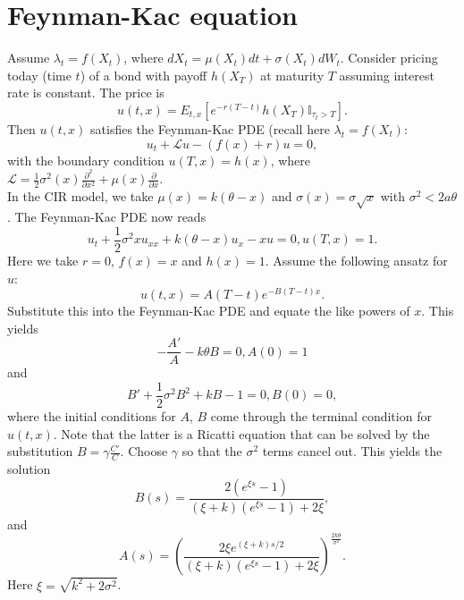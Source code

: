 \documentclass[a4paper,twoside,10pt]{report}
\begin{document}
\chapter{Feynman-Kac equation}
Assume $\lambda_t = f(X_t)$, where $dX_t = \mu(X_t)dt + \sigma(X_t)dW_t$. Consider pricing today (time $t$) of a bond with payoff $h(X_T)$ at maturity $T$ assuming interest rate is constant. The price is \[ u(t,x) = E_{t,x}[e^{-r(T-t)}h(X_T)\mathbb{I}_{\tau_t > T}].\] Then $u(t,x)$ satisfies the Feynman-Kac PDE (recall here $\lambda_t = f(X_t)$: \[ u_t + \mathcal{L}u - (f(x)+r)u = 0, \] with the boundary condition $u(T,x)=h(x)$, where $\mathcal{L} = \frac{1}{2}\sigma^2(x)\frac{\partial^2}{\partial x^2} + \mu(x)\frac{\partial}{\partial x}$. \\
In the CIR model, we take $\mu(x) = k(\theta - x)$ and $\sigma(x) = \sigma \sqrt{x}$ with $\sigma^2 < 2a\theta$. The Feynman-Kac PDE now reads \[ u_t + \frac{1}{2} \sigma^2 x u_{xx} + k(\theta - x)u_x - xu = 0, u(T,x) = 1.\] Here we take $r=0$, $f(x)=x$ and $h(x)=1$. Assume the following ansatz for $u$: 
\begin{equation} \label{fk:sol}
u(t,x) = A(T-t)e^{-B(T-t)x}.
\end{equation} 
Substitute this into the Feynman-Kac PDE and equate the like powers of $x$. This yields \[ - \frac{A'}{A} - k \theta B=0, A(0) = 1\] and \[ B' + \frac{1}{2} \sigma^2 B^2 + kB -1 =0, B(0)=0,\]
where the initial conditions for $A$, $B$ come through the terminal condition for $u(t,x)$. Note that the latter is a Ricatti equation that can be solved by the substitution $B=\gamma \frac{C'}{C}$. Choose $\gamma$ so that the $\sigma^2$ terms cancel out. This yields the solution 
\begin{equation} \label{fk:b}
B(s) = \frac{2(e^{\xi s}-1)}{(\xi +k)(e^{\xi s}-1) +2\xi},
\end{equation} 
and 
\begin{equation} \label{fk:a}
A(s) = (\frac{2\xi e^{(\xi +k)s/2}}{(\xi+k)(e^{\xi s}-1)+2\xi})^{\frac{2k\theta}{\sigma^2}}.
\end{equation}
Here $\xi = \sqrt{k^2 + 2 \sigma^2}$.
\end{document}
